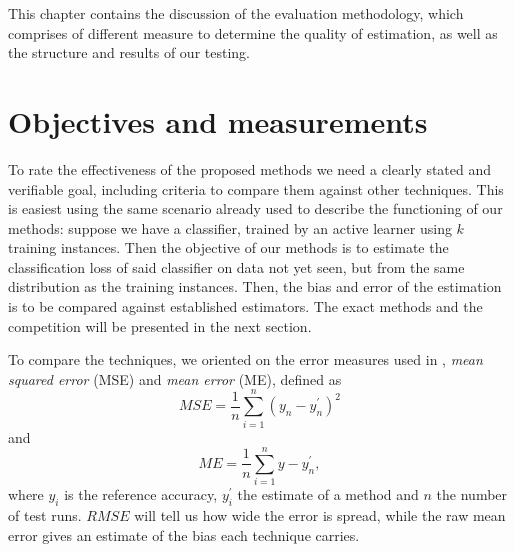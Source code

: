 \label{evaluation}

This chapter contains the discussion of the evaluation methodology, which comprises of different measure to determine the quality of estimation, as well as the structure and results of our testing.

\section{Objectives and measurements}
\label{evaluation:objective}

To rate the effectiveness of the proposed methods we need a clearly stated and verifiable goal, including criteria to compare them against other techniques. This is easiest using the same scenario already used to describe the functioning of our methods: suppose we have a classifier, trained by an active learner using $k$ training instances. Then the objective of our methods is to estimate the classification loss of said classifier on data not yet seen, but from the same distribution as the training instances. Then, the bias and error of the estimation is to be compared against established estimators. The exact methods and the competition will be presented in the next section.

To compare the techniques, we oriented on the error measures used in \cite{FigueroaEtal2012}, \textit{mean squared error} (MSE) and \textit{mean error} (ME), defined as
\begin{equation}
MSE = \frac{1}{n} \sum_{i=1}^{n} \left(y_n - y_n^{'}\right)^2
\end{equation}
and
\begin{equation}ME = \frac{1}{n} \sum_{i=1}^{n} y - y_n^{'},
\end{equation}
where $y_i$ is the reference accuracy, $y_i^{'}$ the estimate of a method and $n$ the number of test runs. $RMSE$ will tell us how wide the error is spread, while the raw mean error gives an estimate of the bias each technique carries.

